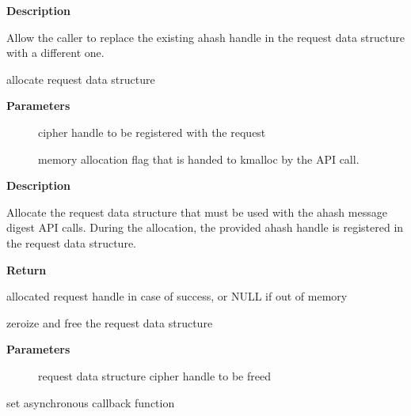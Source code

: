 \documentclass[a4paper,8pt,english]{sphinxmanual}
\begin{document}
\textbf{Description}

Allow the caller to replace the existing ahash handle in the request
data structure with a different one.

\begin{fulllineitems}
\label{crypto/api-digest:c.ahash_request_alloc}
allocate request data structure

\end{fulllineitems}


\textbf{Parameters}
\begin{description}
\item[{}] \leavevmode
cipher handle to be registered with the request

\item[{}] \leavevmode
memory allocation flag that is handed to kmalloc by the API call.

\end{description}

\textbf{Description}

Allocate the request data structure that must be used with the ahash
message digest API calls. During
the allocation, the provided ahash handle
is registered in the request data structure.

\textbf{Return}

allocated request handle in case of success, or NULL if out of memory

\begin{fulllineitems}
\label{crypto/api-digest:c.ahash_request_free}
zeroize and free the request data structure

\end{fulllineitems}


\textbf{Parameters}
\begin{description}
\item[{}] \leavevmode
request data structure cipher handle to be freed

\end{description}

\begin{fulllineitems}
\label{crypto/api-digest:c.ahash_request_set_callback}
set asynchronous callback function

\end{fulllineitems}
\end{document}
